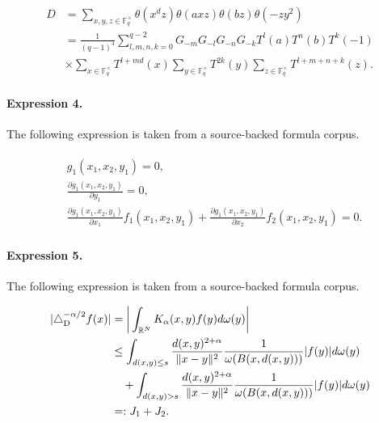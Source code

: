 \documentclass[11pt]{article}
\begin{document}
\begin{align*}D&=\sum_{x,y,z\in\mathbb{F}_{q}^{\times}}\theta(x^dz)\theta(axz)\theta(bz)\theta(-zy^2)\\&=\frac{1}{(q-1)^4}\sum_{l,m,n,k=0}^{q-2}G_{-m}G_{-l}G_{-n}G_{-k}T^l(a)T^n(b)T^k(-1)\\&\times\sum_{x\in\mathbb{F}_{q}^{\times}}T^{l+md}(x)\sum_{y\in\mathbb{F}_{q}^{\times}}T^{2k}(y)\sum_{z\in\mathbb{F}_{q}^{\times}}T^{l+m+n+k}(z).\end{align*}

\paragraph{Expression 4.} The following expression is taken from a source-backed formula corpus.

\begin{align*}\begin{aligned}& g_1\left(x_1,x_2,y_1 \right) = 0,\\& \frac{\partial g_1\left(x_1,x_2,y_1 \right)}{\partial y_1} = 0, \\& \frac{\partial g_1\left(x_1,x_2,y_1 \right)}{\partial x_1} f_1\left(x_1, x_2, y_1 \right) + \frac{\partial g_1\left(x_1,x_2,y_1 \right)}{\partial x_2} f_2\left(x_1,x_2,y_1 \right) = 0.\end{aligned}\end{align*}

\paragraph{Expression 5.} The following expression is taken from a source-backed formula corpus.

\begin{align*} |\triangle_{\rm D}^{-\alpha/2} f(x)|&= \bigg|\int_{\mathbb R^N} K_\alpha(x,y)f(y)d\omega(y)\bigg|\\&\leq\int_{d(x,y)\leq s} \frac{d(x,y)^{2+\alpha}}{\|x-y\|^2}\frac1{\omega(B(x,d(x,y)))}|f(y)|d\omega(y)\\&\quad+\int_{d(x,y)>s} \frac{d(x,y)^{2+\alpha}}{\|x-y\|^2}\frac1{\omega(B(x,d(x,y)))}|f(y)|d\omega(y)\\&=:J_1+J_2.\end{align*}
\end{document}
